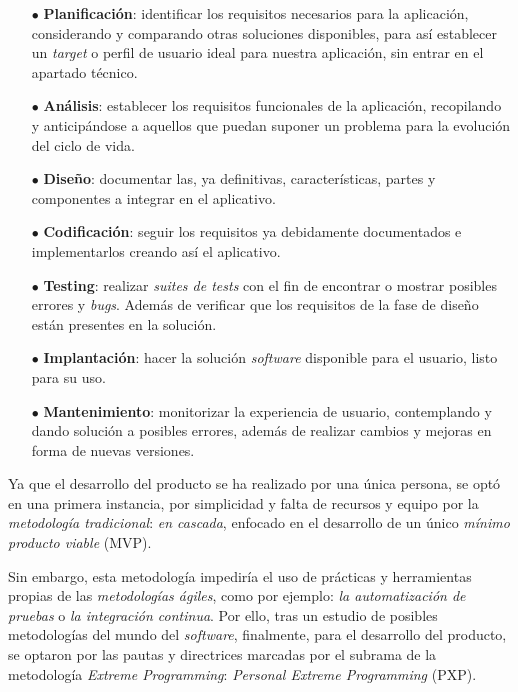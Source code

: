 \begin{itemize}
   \item[$\bullet$] \textbf{Planificación}: identificar los requisitos necesarios para la aplicación,
   considerando y comparando otras soluciones disponibles, para así establecer un \textit{target} o perfil de usuario ideal
   para nuestra aplicación, sin entrar en el apartado técnico.
   \item[$\bullet$] \textbf{Análisis}: establecer los requisitos funcionales de la aplicación, recopilando 
   y anticipándose a aquellos que puedan suponer un problema para la evolución del ciclo de vida.
   \item[$\bullet$] \textbf{Diseño}: documentar las, ya definitivas, características, partes y componentes a integrar en el aplicativo.
   \item[$\bullet$] \textbf{Codificación}: seguir los requisitos ya debidamente documentados e implementarlos creando así el aplicativo. 
   \item[$\bullet$] \textbf{Testing}: realizar \textit{suites de tests} con el fin de encontrar o mostrar
   posibles errores y \textit{bugs}. Además de verificar que los requisitos de la fase de diseño están presentes en la solución.  
   \item[$\bullet$] \textbf{Implantación}: hacer la solución \textit{software} disponible para el usuario, listo
   para su uso.
   \item[$\bullet$] \textbf{Mantenimiento}: monitorizar la experiencia de usuario, contemplando y dando solución a posibles errores,
   además de realizar cambios y mejoras en forma de nuevas versiones.
\end{itemize}

Ya que el desarrollo del producto se ha realizado por una única persona, se optó en una primera instancia, por simplicidad y falta de recursos y equipo por
la \textit{metodología tradicional}: \textit{en cascada}, enfocado en el desarrollo de un único \textit{mínimo producto viable} (MVP).

Sin embargo, esta metodología impediría el uso de prácticas y herramientas propias de las \textit{metodologías ágiles}, como por ejemplo: \textit{la automatización de pruebas} o
\textit{la integración continua}. Por ello, tras un estudio de posibles metodologías del mundo del \textit{software}, finalmente, para el desarrollo del producto, se optaron por las pautas y directrices marcadas por el subrama de la metodología
\textit{Extreme Programming}: \textit{Personal Extreme Programming} (PXP).

